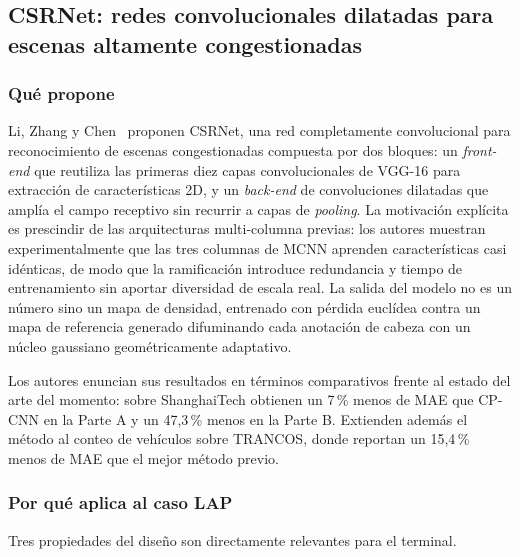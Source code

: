 \subsection{CSRNet: redes convolucionales dilatadas para escenas altamente congestionadas}
\label{sec:ant-csrnet}

\subsubsection*{Qué propone}

Li, Zhang y Chen~\cite{Li_2018_CVPR} proponen CSRNet, una red
completamente convolucional para reconocimiento de escenas congestionadas
compuesta por dos bloques: un \emph{front-end} que reutiliza las primeras
diez capas convolucionales de VGG-16 para extracción de características
2D, y un \emph{back-end} de convoluciones dilatadas que amplía el campo
receptivo sin recurrir a capas de \emph{pooling}. La motivación explícita
es prescindir de las arquitecturas multi-columna previas: los autores
muestran experimentalmente que las tres columnas de MCNN aprenden
características casi idénticas, de modo que la ramificación introduce
redundancia y tiempo de entrenamiento sin aportar diversidad de escala
real. La salida del modelo no es un número sino un mapa de densidad,
entrenado con pérdida euclídea contra un mapa de referencia generado
difuminando cada anotación de cabeza con un núcleo gaussiano
geométricamente adaptativo.

Los autores enuncian sus resultados en términos comparativos frente al
estado del arte del momento: sobre ShanghaiTech obtienen un 7\,\% menos de
MAE que CP-CNN en la Parte A y un 47,3\,\% menos en la Parte B. Extienden
además el método al conteo de vehículos sobre TRANCOS, donde reportan un
15,4\,\% menos de MAE que el mejor método previo.

\subsubsection*{Por qué aplica al caso LAP}

Tres propiedades del diseño son directamente relevantes para el terminal.

